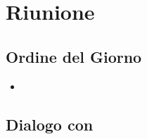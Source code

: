 \section{Riunione}
\subsection{Ordine del Giorno}
\begin{itemize}
	\item

\end{itemize}

\subsection{Dialogo con \Proponente}
\subsubsection{}

\clearpage
